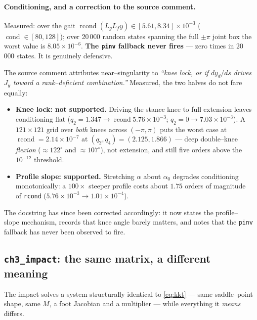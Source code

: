 \documentclass[11pt,a4paper]{article}
\newcommand{\code}[1]{\texttt{#1}}          %
\newcommand{\warn}[1]{\textcolor{red!70!black}{\textbf{#1}}}
\begin{document}
\paragraph{Conditioning, and a correction to the source comment.}
Measured: over the gait $\operatorname{rcond}(L_gL_fy)\in[5.61,8.34]\times10^{-3}$
($\operatorname{cond}\in[80,128]$); over 20\,000 random states spanning the full
$\pm\pi$ joint box the worst value is $8.05\times10^{-6}$. \textbf{The
\code{pinv} fallback never fires} --- zero times in 20\,000 states. It is
genuinely defensive.

The source comment attributes near--singularity to \emph{``knee lock, or if
$dy_d/ds$ drives $J_y$ toward a rank--deficient combination.''} Measured, the two
halves do not fare equally:
\begin{itemize}
  \item \warn{Knee lock: not supported.} Driving the stance knee to full
        extension leaves conditioning flat
        ($q_2 = 1.347 \to \operatorname{rcond} 5.76\times10^{-3}$;
         $q_2 = 0 \to 7.03\times10^{-3}$). A $121\times121$ grid over
        \emph{both} knees across $(-\pi,\pi)$ puts the worst case at
        $\operatorname{rcond} = 2.14\times10^{-7}$ at
        $(q_2,q_4)=(2.125,1.866)$ --- deep double--knee \emph{flexion}
        ($\approx122^\circ$ and $\approx107^\circ$), not extension, and still
        five orders above the $10^{-12}$ threshold.
  \item \textbf{Profile slope: supported.} Stretching $\alpha$ about $\alpha_0$
        degrades conditioning monotonically: a $100\times$ steeper profile costs
        about $1.75$ orders of magnitude of \code{rcond}
        ($5.76\times10^{-3} \to 1.01\times10^{-4}$).
\end{itemize}

The docstring has since been corrected accordingly: it now states the
profile--slope mechanism, records that knee angle barely matters, and notes that
the \code{pinv} fallback has never been observed to fire.

\subsection{\code{ch3\_impact}: the same matrix, a different meaning}
The impact solves a system structurally identical to \eqref{eq:kkt} --- same
saddle--point shape, same $M$, a foot Jacobian and a multiplier --- while
everything it \emph{means} differs.
\end{document}
